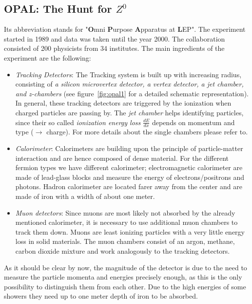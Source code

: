 \subsection{\textbf{OPAL}: The Hunt for $Z^0$}
\label{sub:OPAL}
Its abbreviation stands for  "\textbf{O}mni \textbf{P}urpose \textbf{A}pparatus at \textbf{L}EP". The experiment started in
1989 and data was taken until the year 2000. The collaboration consisted of 200 physicists from 34 institutes.
The main ingredients of the experiment are the following: 
\begin{itemize}
    \item \emph{Tracking Detectors}: The Tracking system is built up with increasing radius, consisting of 
        \textit{a silicon microvertex detector, a vertex detector, a jet chamber, and z-chambers}\cite{CERN_OPAL} 
        (see figure~\ref{fig:opal1} for a detailed schematic representation). In general, these tracking detectors
    are triggered by the ionization when charged particles are passing by. 
    The \textit{jet chamber} helps identifying particles, since their so
    called \textit{ionization energy loss} $\frac{dE}{dx}$ depends on momentum and type ($\rightarrow$ charge). For
    more details about the single chambers please refer to\cite{CERN_OPAL}.
\item \emph{Calorimeter}: Calorimeters are building upon the principle of particle-matter interaction and are hence
    composed of dense material. For the different fermion types we have different calorimeter; electromagnetic calorimeter
    are made of lead-glass blocks and measure the energy of electrons/positrons and photons. Hadron calorimeter are located
    farer away from the center and are made of iron with a width of about one meter. 
\item \emph{Muon detectors}: Since muons are most likely not absorbed by the already mentioned calorimeter, it is necessary 
        to use additional muon chambers to track them down. Muons are least ionizing particles with a very little energy
        loss in solid materials. The muon chambers consist of an argon, methane, carbon dioxide mixture and work analogously to
        the tracking detectors. 
\end{itemize}
As it should be clear by now, the magnitude of the detector is due to the need to measure the particle momenta and energies
precisely enough, as this is the only possibility to distinguish them from each other. Due to the high energies of some showers
they need up to one meter depth of iron to be absorbed. 
